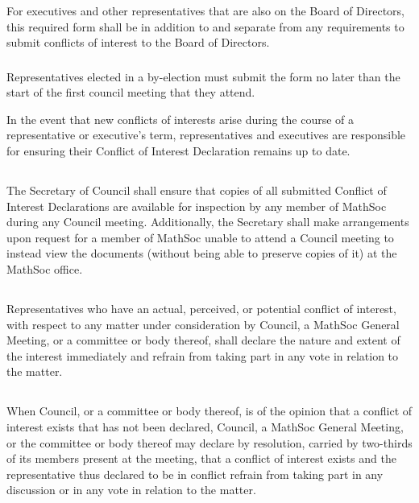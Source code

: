 For executives and other representatives that are also on the Board of Directors, this required form shall be in addition to and separate from any requirements to submit conflicts of interest to the Board of Directors.

\subsubsection{} 

Representatives elected in a by-election must submit the form no later than the start of the first council meeting that they attend.

\subsubection{} 

In the event that new conflicts of interests arise during the course of a representative or executive’s term, representatives and executives are responsible for ensuring their Conflict of Interest Declaration remains up to date.

\subsection{} 

The Secretary of Council shall ensure that copies of all submitted Conflict of Interest Declarations are available for inspection by any member of MathSoc during any Council meeting. Additionally, the Secretary shall make arrangements upon request for a member of MathSoc unable to attend a Council meeting to instead view the documents (without being able to preserve copies of it) at the MathSoc office.

\subsection{} 

Representatives who have an actual, perceived, or potential conflict of interest, with respect to any matter under consideration by Council, a MathSoc General Meeting, or a committee or body thereof, shall declare the nature and extent of the interest immediately and refrain from taking part in any vote in relation to the matter.

\subsection{} 

When Council, or a committee or body thereof, is of the opinion that a conflict of interest exists that has not been declared, Council, a MathSoc General Meeting, or the committee or body thereof may declare by resolution, carried by two-thirds of its members present at the meeting, that a conflict of interest exists and the representative thus declared to be in conflict refrain from taking part in any discussion or in any vote in relation to the matter.
